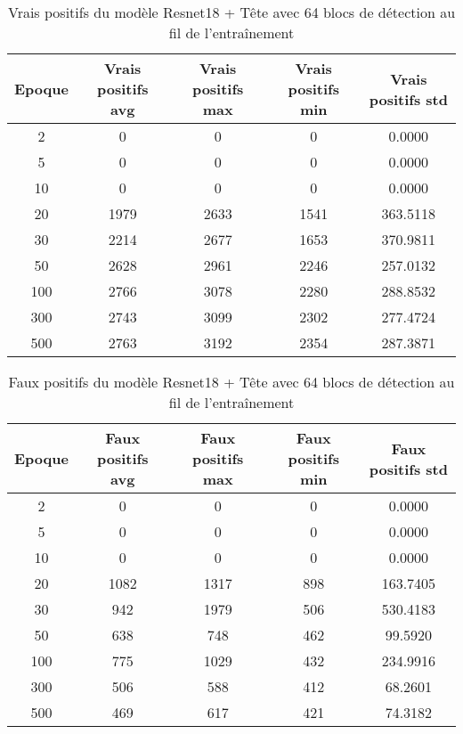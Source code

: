 \begin{table}[!ht]
    \caption{Vrais positifs du modèle Resnet18 + Tête avec 64 blocs de détection au fil de l'entraînement}
    \label{tab:resnet18+head_64n_true_positive}
    \centering
    \begin{tabular}{ |c||c|c|c|c|  }
        \hline
        \rowcolor{gray!50}
        Epoque & Vrais positifs avg & Vrais positifs max & Vrais positifs min & Vrais positifs std\\
        \hline
        2 & 0 & 0 & 0 & 0.0000\\
        5 & 0 & 0 & 0 & 0.0000\\
        10 & 0 & 0 & 0 & 0.0000\\
        20 & 1979 & 2633 & 1541 & 363.5118\\
        30 & 2214 & 2677 & 1653 & 370.9811\\
        50 & 2628 & 2961 & 2246 & 257.0132\\
        100 & 2766 & 3078 & 2280 & 288.8532\\
        300 & 2743 & 3099 & 2302 & 277.4724\\
        500 & 2763 & 3192 & 2354 & 287.3871\\
        \hline
    \end{tabular}
\end{table}

\begin{table}[!ht]
    \caption{Faux positifs du modèle Resnet18 + Tête avec 64 blocs de détection au fil de l'entraînement}
    \label{tab:resnet18+head_64n_false_positive}
    \centering
    \begin{tabular}{ |c||c|c|c|c|  }
        \hline
        \rowcolor{gray!50}
        Epoque & Faux positifs avg & Faux positifs max & Faux positifs min & Faux positifs std\\
        \hline
        2 & 0 & 0 & 0 & 0.0000\\
        5 & 0 & 0 & 0 & 0.0000\\
        10 & 0 & 0 & 0 & 0.0000\\
        20 & 1082 & 1317 & 898 & 163.7405\\
        30 & 942 & 1979 & 506 & 530.4183\\
        50 & 638 & 748 & 462 & 99.5920\\
        100 & 775 & 1029 & 432 & 234.9916\\
        300 & 506 & 588 & 412 & 68.2601\\
        500 & 469 & 617 & 421 & 74.3182\\
        \hline
    \end{tabular}
\end{table}

